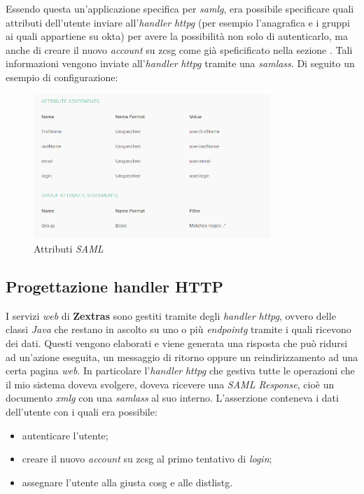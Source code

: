 Essendo questa un'applicazione specifica per \textit{\gls{samlg}}, era possibile specificare quali attributi dell'utente inviare all'\textit{handler} \textit{\gls{httpg}} (per esempio l'anagrafica e i gruppi ai quali appartiene su \gls{okta}) per avere la possibilità non solo di autenticarlo, ma anche di creare il nuovo \textit{account} su \gls{zcsg} come già speficificato nella sezione . Tali informazioni vengono inviate all'\textit{handler} \textit{\gls{httpg}} tramite una \textit{\gls{samlass}}. Di seguito un esempio di configurazione:

    \begin{figure}[ht]
        \centering
        \includegraphics[width=0.8\textwidth]{immagini/saml_attributes.png}
        \caption{Attributi \textit{SAML}}
        \label{fig: Attributi SAML}
    \end{figure}

\subsection{Progettazione handler HTTP}
I servizi \textit{web} di \textbf{Zextras} sono gestiti tramite degli \textit{handler} \textit{\gls{httpg}}, ovvero delle classi \textit{Java} che restano in ascolto su uno o più \textit{\gls{endpointg}} tramite i quali ricevono dei dati. Questi vengono elaborati e viene generata una risposta che può ridursi ad un'azione eseguita, un messaggio di ritorno oppure un reindirizzamento ad una certa pagina \textit{web}. In particolare l'\textit{handler} \textit{\gls{httpg}} che gestiva tutte le operazioni che il mio sistema doveva svolgere, doveva ricevere una \textit{SAML Response}, cioè un documento \textit{\gls{xmlg}} con una \textit{\gls{samlass}} al suo interno. L'asserzione conteneva i dati dell'utente con i quali era possibile:
\begin{itemize}
    \setlength\itemsep{0em}
    \item autenticare l'utente;
    \item creare il nuovo \textit{account} su \gls{zcsg} al primo tentativo di \textit{login};
    \item assegnare l'utente alla giusta \gls{cosg} e alle \gls{distlistg}.
\end{itemize}
